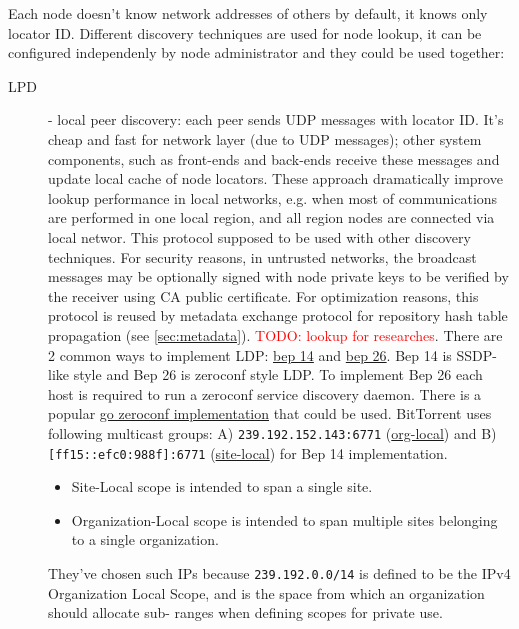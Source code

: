 \documentclass[acmlarge, screen, nonacm]{acmart}
\newcommand{\code}[1]{\texttt{#1}}
\newcommand{\todo}[1]{\textcolor{red}{TODO: #1}}
\begin{document}
Each node doesn't know network addresses of others by default, it knows only locator ID.
Different discovery techniques are used for node lookup, it can be configured independenly by node
administrator and they could be used together:

\begin{description}
  \item[LPD] - local peer discovery: each peer sends UDP messages with locator ID.
    It's cheap and fast for network layer (due to UDP messages); other system components,
    such as front-ends and back-ends receive these messages and update local cache of node locators.
    These approach dramatically improve lookup performance in local networks, e.g. when most of communications
    are performed in one local region, and all region nodes are connected via local networ.
    This protocol supposed to be used with other discovery techniques.
    For security reasons, in untrusted networks, the broadcast messages may be optionally signed with
    node private keys to be verified by the receiver using CA public certificate.
    For optimization reasons, this protocol is reused by metadata exchange protocol for
    repository hash table propagation (see \ref{sec:metadata}). \todo{lookup for researches}.
    There are 2 common ways to implement LDP: \href{http://bittorrent.org/beps/bep_0014.html}{bep 14} and \href{http://bittorrent.org/beps/bep_0026.html}{bep 26}.
    Bep 14 is SSDP-like style and Bep 26 is zeroconf style LDP. To implement Bep 26 each host is required to run a zeroconf service discovery daemon.
    There is a popular \href{https://github.com/grandcat/zeroconf}{go zeroconf implementation} that could be used.
    BitTorrent uses following multicast groups: A) \code{239.192.152.143:6771} (\href{https://tools.ietf.org/html/rfc2365#section-6.2}{org-local}) and B) \code{[ff15::efc0:988f]:6771} (\href{https://tools.ietf.org/html/rfc4291#section-2.5.7}{site-local}) for Bep 14 implementation.
    \begin{itemize}
      \item Site-Local scope is intended to span a single site.
      \item Organization-Local scope is intended to span multiple sites
      belonging to a single organization.
    \end{itemize}
    They've chosen such IPs because \code{239.192.0.0/14} is defined to be the IPv4 Organization Local Scope,
    and is the space from which an organization should allocate sub-
    ranges when defining scopes for private use.

\end{description}
\end{document}
